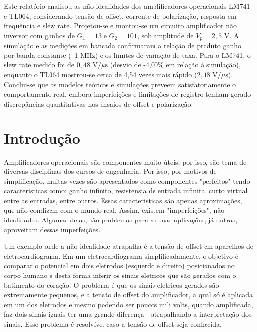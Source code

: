 \documentclass[11pt,a4paper]{article}
\begin{document}
\capa

\begin{resumo}
Este relatório analisou as não-idealidades dos amplificadores operacionais LM741 e TL064, considerando tensão de offset, corrente de polarização, resposta em frequência e slew rate. Projetou-se e montou-se um circuito amplificador não inversor com ganhos de $G_1 = 13$ e $G_2 = 101$, sob amplitude de $V_p = 2{,}5\text{ V}$. A simulação e as medições em bancada confirmaram a relação de produto ganho por banda constante (~1 MHz) e os limites de variação de taxa. Para o LM741, o slew rate medido foi de $0{,}48\text{ V/}\mu\text{s}$ (desvio de -4,00\% em relação à simulação), enquanto o TL064 mostrou-se cerca de 4,54 vezes mais rápido ($2{,}18\text{ V/}\mu\text{s}$). Conclui-se que os modelos teóricos e simulações preveem satisfatoriamente o comportamento real, embora imperfeições e limitações de registro tenham gerado discrepâncias quantitativas nos ensaios de offset e polarização.   
\end{resumo}

\section{Introdução}

Amplificadores operacionais são componentes muito úteis, por isso, são tema de diversas disciplinas dos cursos de engenharia.
Por isso, por motivos de simplificação, muitas vezes são apresentados como componentes "perfeitos" tendo caracteristicas como:
ganho infinito, resistensia de entrada infinita, curto virtual entre as entradas, entre outros.
Essas caracteristicas são apenas aproximações, que não condizem com o mundo real. Assim, existem "imperfeições", não idealidades. Algumas delas, são problemas para as suas aplicações, já outras, aproveitam dessas imperfeições.

Um exemplo onde a não idealidade atrapalha é a tensão de offset em aparelhos de eletrocardiograma.
Em um eletrocardiograma simplificadamente, o objetivo é comparar o potencial em dois eletrodos (esquerdo e direito) posicionados no corpo humano e desta forma inferir os sinais eletricos que são gerados com o batimento do coração.
O problema é que os sinais eletricos gerados são extremamente pequenos, e a tensão de offset do amplificador, a qual só é aplicada em um dos eletrodos e mesmo podendo ser poucos mili volts, quando amplificada, faz dois sinais iguais ter uma grande diferença - atrapalhando a interpretação dos sinais. Esse problema é resolvível caso a tensão de offset seja conhecida.
\end{document}
